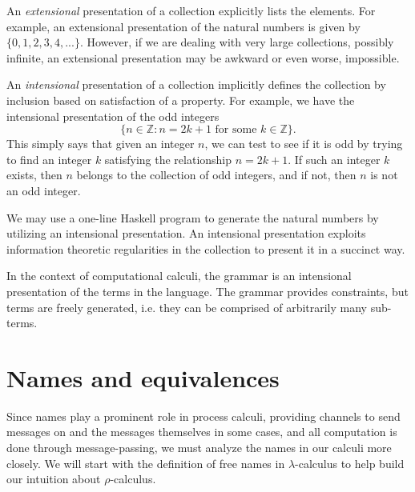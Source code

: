 \documentclass[12pt]{article}
\numberwithin{equation}{section}
\begin{document}
An \emph{extensional} presentation of a collection explicitly lists the elements. For example, an extensional presentation of the natural numbers is given by $\{0, 1, 2, 3, 4, ... \}$. However, if we are dealing with very large collections, possibly infinite, an extensional presentation may be awkward or even worse, impossible.

An \emph{intensional} presentation of a collection implicitly defines the collection by inclusion based on satisfaction of a property. For example, we have the intensional presentation of the odd integers 
\[ \{ n \in \mathbb{Z}: n=2k+1 \text{ for some } k \in \mathbb{Z} \}. \]
This simply says that given an integer $n$, we can test to see if it is odd by trying to find an integer $k$ satisfying the relationship $n=2k+1$. If such an integer $k$ exists, then $n$ belongs to the collection of odd integers, and if not, then $n$ is not an odd integer.

We may use a one-line Haskell program to generate the natural numbers by utilizing an intensional presentation. An intensional presentation exploits information theoretic regularities in the collection to present it in a succinct way.

In the context of computational calculi, the grammar is an intensional presentation of the terms in the language. The grammar provides constraints, but terms are freely generated, i.e. they can be comprised of arbitrarily many sub-terms.

\section{Names and equivalences}
Since names play a prominent role in process calculi, providing channels to send messages on and the messages themselves in some cases, and all computation is done through message-passing, we must analyze the names in our calculi more closely. We will start with the definition of free names in $\lambda$-calculus to help build our intuition about $\rho$-calculus.
\end{document}
